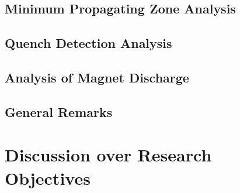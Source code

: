 \documentclass[11pt,a4paper]{report}
\begin{document}
\section{Minimum Propagating Zone Analysis}


\section{Quench Detection Analysis}


\section{Analysis of Magnet Discharge}


\section{General Remarks}


\clearpage
\chapter{Discussion over Research Objectives}
\label{chapter:research_questions_discussions}
\end{document}
